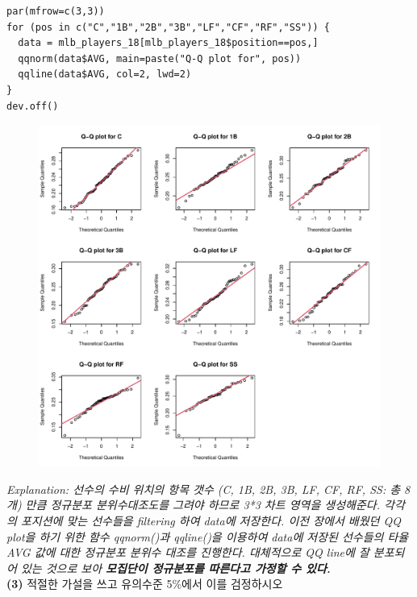 \documentclass{article}
\begin{document}
\begin{lstlisting}[style={r-style}]
par(mfrow=c(3,3))
for (pos in c("C","1B","2B","3B","LF","CF","RF","SS")) {
  data = mlb_players_18[mlb_players_18$position==pos,]
  qqnorm(data$AVG, main=paste("Q-Q plot for", pos))
  qqline(data$AVG, col=2, lwd=2)
}
dev.off()
\end{lstlisting}
\begin{figure}[htb!]
    \centering
    \includegraphics[width=\textwidth]{fig/ex5-2.pdf}
\end{figure}
\newpage
\emph{Explanation: 선수의 수비 위치의 항목 갯수 (C, 1B, 2B, 3B, LF, CF, RF, SS: 총 8개) 만큼 정규분포 분위수대조도를 그려야 하므로 3*3 차트 영역을 생성해준다. 각각의 포지션에 맞는 선수들을 filtering 하여 data에 저장한다. 이전 장에서 배웠던 QQ plot을 하기 위한 함수 qqnorm()과 qqline()을 이용하여 data에 저장된 선수들의 타율 AVG 값에 대한 정규분포 분위수 대조를 진행한다. 대체적으로 QQ line에 잘 분포되어 있는 것으로 보아 \textbf{모집단이 정규분포를 따른다고 가정할 수 있다.}} \\

\newpage
\textbf{(3)} 적절한 가설을 쓰고 유의수준 5\%에서 이를 검정하시오
\end{document}
